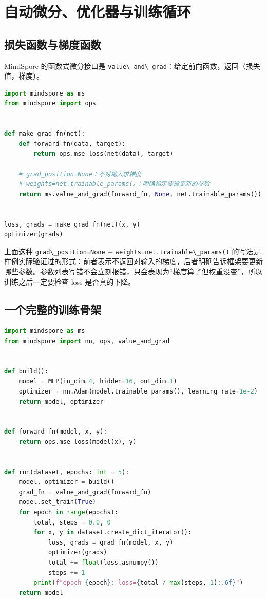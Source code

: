 \section{自动微分、优化器与训练循环}\label{src-book-chapter5-h19}

\subsection{损失函数与梯度函数}\label{src-book-chapter5-h20}

MindSpore 的函数式微分接口是
\passthrough{\lstinline!value\_and\_grad!}：给定前向函数，返回（损失值，梯度）。

\begin{lstlisting}[language=Python]
import mindspore as ms
from mindspore import ops


def make_grad_fn(net):
    def forward_fn(data, target):
        return ops.mse_loss(net(data), target)

    # grad_position=None：不对输入求梯度
    # weights=net.trainable_params()：明确指定要被更新的参数
    return ms.value_and_grad(forward_fn, None, net.trainable_params())


loss, grads = make_grad_fn(net)(x, y)
optimizer(grads)
\end{lstlisting}

上面这种 \passthrough{\lstinline!grad\_position=None!} +
\passthrough{\lstinline!weights=net.trainable\_params()!}
的写法是样例实际验证过的形式：前者表示不返回对输入的梯度，后者明确告诉框架要更新哪些参数。参数列表写错不会立刻报错，只会表现为``梯度算了但权重没变''，所以训练之后一定要检查
loss 是否真的下降。

\subsection{一个完整的训练骨架}\label{src-book-chapter5-h21}

\begin{lstlisting}[language=Python]
import mindspore as ms
from mindspore import nn, ops, value_and_grad


def build():
    model = MLP(in_dim=4, hidden=16, out_dim=1)
    optimizer = nn.Adam(model.trainable_params(), learning_rate=1e-2)
    return model, optimizer


def forward_fn(model, x, y):
    return ops.mse_loss(model(x), y)


def run(dataset, epochs: int = 5):
    model, optimizer = build()
    grad_fn = value_and_grad(forward_fn)
    model.set_train(True)
    for epoch in range(epochs):
        total, steps = 0.0, 0
        for x, y in dataset.create_dict_iterator():
            loss, grads = grad_fn(model, x, y)
            optimizer(grads)
            total += float(loss.asnumpy())
            steps += 1
        print(f"epoch {epoch}: loss={total / max(steps, 1):.6f}")
    return model
\end{lstlisting}

